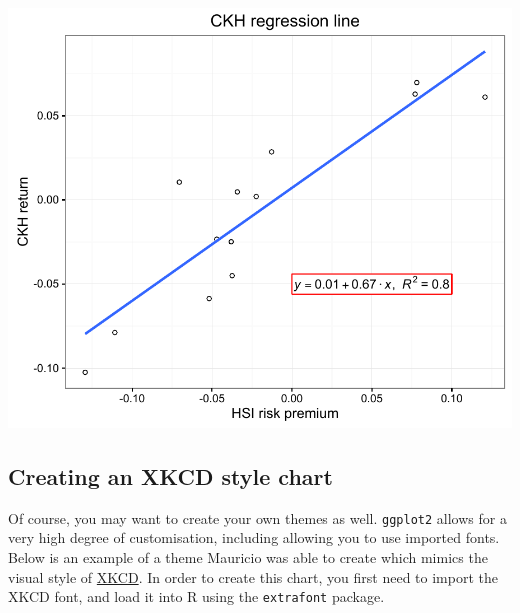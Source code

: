 \documentclass[]{article}
\begin{document}
\begin{center}\includegraphics{11_Linear_Regression_Plot_pdf/lr_14-1} \end{center}

\subsection{Creating an XKCD style
chart}\label{creating-an-xkcd-style-chart}

Of course, you may want to create your own themes as well.
\texttt{ggplot2} allows for a very high degree of customisation,
including allowing you to use imported fonts. Below is an example of a
theme Mauricio was able to create which mimics the visual style of
\href{http://xkcd.com/}{XKCD}. In order to create this chart, you first
need to import the XKCD font, and load it into R using the
\texttt{extrafont} package.
\end{document}
